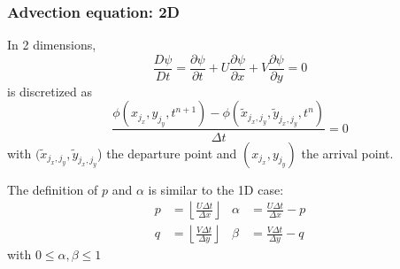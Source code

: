 \documentclass[aspectratio=43,9pt]{beamer}
\begin{document}
%
%
\begin{frame}
	\frametitle{Advection equation: 2D}
	\begin{myitemize}{2ex}
		\item In 2 dimensions,
			\begin{equation*}
				\frac{D\psi}{D t}=\frac{\partial \psi}{\partial t}+U\frac{\partial \psi}{\partial x}+V\frac{\partial \psi}{\partial y} = 0
			\end{equation*}
			is discretized as
			\begin{equation*}
				\frac{\phi (x_{j_x}, y_{j_y}, t^{n+1}) - \phi (\tilde x_{j_x,j_y}, \tilde y_{j_x,j_y}, t^n ) } {\Delta t} = 0
			\end{equation*}
			with $(\tilde x_{j_x,j_y}, \tilde y_{j_x,j_y}$) the departure point and $(x_{j_x}, y_{j_y})$ the arrival point.
		\item The definition of $p$ and $\alpha$ is similar to the 1D case:
			\begin{align*}
				p &= \left\lfloor \frac{U \Delta t}{\Delta x} \right\rfloor & \alpha &	= \frac{U \Delta t }{\Delta x}-p \\
				q &= \left\lfloor \frac{V \Delta t}{\Delta y} \right\rfloor	&	\beta &	= \frac{V \Delta t }{\Delta y}-q
			\end{align*}
			with $0\le\alpha,\beta\le1$
	\end{myitemize}
\end{frame}
%
%
\end{document}
